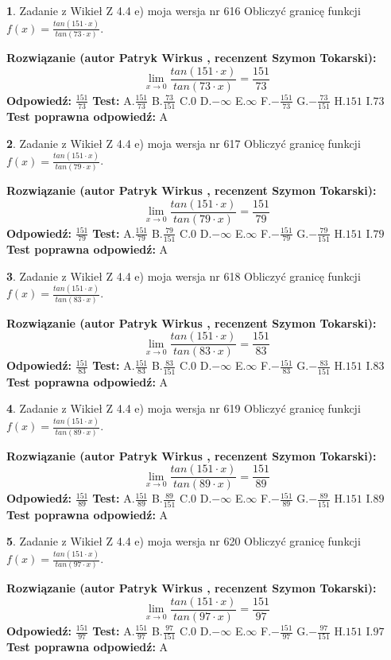 \documentclass[12pt, a4paper]{article}
\theoremstyle{definition} %
\newtheorem{zad}{}
\newcommand{\zadStart}[1]{\begin{zad}#1\newline}
\newcommand{\zadStop}{\end{zad}}
\newcommand{\rozwStart}[2]{\noindent \textbf{Rozwiązanie (autor #1 , recenzent #2): }\newline}
\newcommand{\rozwStop}{\newline}
\newcommand{\odpStart}{\noindent \textbf{Odpowiedź:}\newline}
\newcommand{\odpStop}{\newline}
\newcommand{\testStart}{\noindent \textbf{Test:}\newline}
\newcommand{\testStop}{\newline}
\newcommand{\kluczStart}{\noindent \textbf{Test poprawna odpowiedź:}\newline}
\newcommand{\kluczStop}{\newline}
\begin{document}
\zadStart{Zadanie z Wikieł Z 4.4 e) moja wersja nr 616}
Obliczyć granicę funkcji $f(x)=\frac{tan(151\cdot x)}{tan(73\cdot x)}$.
\zadStop
\rozwStart{Patryk Wirkus}{Szymon Tokarski}
$$\lim\limits_{x\to 0}\frac{tan(151\cdot x)}{tan(73\cdot x)}=
\frac{151}{73}$$
\rozwStop
\odpStart
$\frac{151}{73}$
\odpStop
\testStart
A.$\frac{151}{73}$
B.$\frac{73}{151}$
C.$0$
D.$-\infty$
E.$\infty$
F.$-\frac{151}{73}$
G.$-\frac{73}{151}$
H.$151$
I.$73$
\testStop
\kluczStart
A
\kluczStop



\zadStart{Zadanie z Wikieł Z 4.4 e) moja wersja nr 617}
Obliczyć granicę funkcji $f(x)=\frac{tan(151\cdot x)}{tan(79\cdot x)}$.
\zadStop
\rozwStart{Patryk Wirkus}{Szymon Tokarski}
$$\lim\limits_{x\to 0}\frac{tan(151\cdot x)}{tan(79\cdot x)}=
\frac{151}{79}$$
\rozwStop
\odpStart
$\frac{151}{79}$
\odpStop
\testStart
A.$\frac{151}{79}$
B.$\frac{79}{151}$
C.$0$
D.$-\infty$
E.$\infty$
F.$-\frac{151}{79}$
G.$-\frac{79}{151}$
H.$151$
I.$79$
\testStop
\kluczStart
A
\kluczStop



\zadStart{Zadanie z Wikieł Z 4.4 e) moja wersja nr 618}
Obliczyć granicę funkcji $f(x)=\frac{tan(151\cdot x)}{tan(83\cdot x)}$.
\zadStop
\rozwStart{Patryk Wirkus}{Szymon Tokarski}
$$\lim\limits_{x\to 0}\frac{tan(151\cdot x)}{tan(83\cdot x)}=
\frac{151}{83}$$
\rozwStop
\odpStart
$\frac{151}{83}$
\odpStop
\testStart
A.$\frac{151}{83}$
B.$\frac{83}{151}$
C.$0$
D.$-\infty$
E.$\infty$
F.$-\frac{151}{83}$
G.$-\frac{83}{151}$
H.$151$
I.$83$
\testStop
\kluczStart
A
\kluczStop



\zadStart{Zadanie z Wikieł Z 4.4 e) moja wersja nr 619}
Obliczyć granicę funkcji $f(x)=\frac{tan(151\cdot x)}{tan(89\cdot x)}$.
\zadStop
\rozwStart{Patryk Wirkus}{Szymon Tokarski}
$$\lim\limits_{x\to 0}\frac{tan(151\cdot x)}{tan(89\cdot x)}=
\frac{151}{89}$$
\rozwStop
\odpStart
$\frac{151}{89}$
\odpStop
\testStart
A.$\frac{151}{89}$
B.$\frac{89}{151}$
C.$0$
D.$-\infty$
E.$\infty$
F.$-\frac{151}{89}$
G.$-\frac{89}{151}$
H.$151$
I.$89$
\testStop
\kluczStart
A
\kluczStop



\zadStart{Zadanie z Wikieł Z 4.4 e) moja wersja nr 620}
Obliczyć granicę funkcji $f(x)=\frac{tan(151\cdot x)}{tan(97\cdot x)}$.
\zadStop
\rozwStart{Patryk Wirkus}{Szymon Tokarski}
$$\lim\limits_{x\to 0}\frac{tan(151\cdot x)}{tan(97\cdot x)}=
\frac{151}{97}$$
\rozwStop
\odpStart
$\frac{151}{97}$
\odpStop
\testStart
A.$\frac{151}{97}$
B.$\frac{97}{151}$
C.$0$
D.$-\infty$
E.$\infty$
F.$-\frac{151}{97}$
G.$-\frac{97}{151}$
H.$151$
I.$97$
\testStop
\kluczStart
A
\kluczStop
\end{document}
